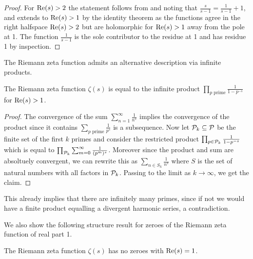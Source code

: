 \begin{proof}
    For $\mathrm{Re}(s)>2$ the statement follows from  and noting that $\frac{s}{s-1}=\frac{1}{s-1}+1$, and extends to $\mathrm{Re}(s)>1$ by the identity theorem  as the functions agree in the right halfspace $\mathrm{Re}(s)>2$ but are holomorphic for $\mathrm{Re}(s)>1$ away from the pole at 1. The function $\frac{1}{s-1}$ is the sole contributor to the residue at 1 and has residue 1 by inspection. 
\end{proof}
The Riemann zeta function admits an alternative description via infinite products. 
\begin{theorem}\label{thm: zeta function by infinite products}
    The Riemann zeta function $\zeta(s)$ is equal to the infinite product $\prod_{p\text{ prime}}\frac{1}{1-p^{-s}}$ for $\mathrm{Re}(s)>1$. 
\end{theorem}
\begin{proof}
    The convergence of the sum $\sum_{n=1}^{\infty}\frac{1}{n^{s}}$ implies the convergence of the product since it contains $\sum_{p\text{ prime}}\frac{1}{p^{s}}$ is a subsequence. Now let $\mathcal{P}_{k}\subseteq\mathcal{P}$ be the finite set of the first $k$ primes and consider the restricted product $\prod_{p\in\mathcal{P}_{k}}\frac{1}{1-p^{-s}}$ which is equal to $\prod_{\mathcal{P}_{k}}\sum_{m=0}^{\infty}\frac{1}{(p^{m})^{s}}$. Moreover since the product and sum are absoltuely convergent, we can rewrite this as $\sum_{n\in S_{k}}\frac{1}{n^{s}}$ where $S$ is the set of natural numbers with all factors in $\mathcal{P}_{k}$. Passing to the limit as $k\to\infty$, we get the claim. 
\end{proof}
\begin{remark}
    This already implies that there are infinitely many primes, since if not we would have a finite product equalling a divergent harmonic series, a contradiction. 
\end{remark}
We also show the following structure result for zeroes of the Riemann zeta function of real part 1. 
\begin{theorem}\label{thm: no zeroes at real part 1}
    The Riemann zeta function $\zeta(s)$ has no zeroes with $\mathrm{Re}(s)=1$.
\end{theorem}
